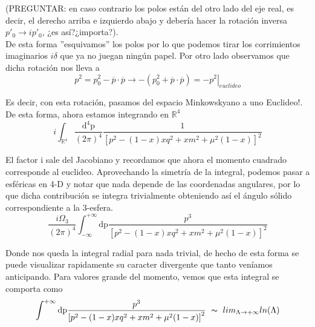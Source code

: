 \documentclass{article}
\numberwithin{equation}{section}
\begin{document}
(PREGUNTAR: en caso contrario los polos están del
otro lado del eje real, es decir, el derecho arriba e izquierdo abajo
y debería hacer la rotación inversa $p'_{0}\rightarrow ip'_{0}$,
¿es así?¿importa?).\\

De esta forma ''esquivamos'' los polos por lo que podemos tirar los corrimientos
imaginarios $i\delta$ que ya no juegan ningún papel. Por otro lado
observamos que dicha rotación nos lleva a 
\begin{equation}
p^{2}=p_{0}^{2}-\overline{p}\cdot\overline{p}\rightarrow-\left(p_{0}^{2}+\overline{p}\cdot\overline{p}\right)=\left. -p^{2}\right|_{euclideo}
\end{equation}

Es decir, con esta rotación, pasamos del espacio Minkowskyano a uno
Euclideo!. De esta forma, ahora estamos integrando en $\mathbb{R}^{4}$
\begin{equation}\label{parteeuclidea}
i\int_{\mathbb{R}^{4}}\frac{\mathrm{d^{4}p}}{(2\pi)^{4}}\frac{1}{\left[p^{2}-(1-x)xq^{2} + x m^{2} + \mu^{2}(1-x)\right]^{2}}
\end{equation}

El factor i sale del Jacobiano y recordamos que ahora el momento cuadrado corresponde al
euclideo. Aprovechando la simetría de la integral, podemos pasar a esféricas
en 4-D y notar que nada depende de las coordenadas angulares, por lo que dicha contribución se integra trivialmente obteniendo así el ángulo sólido correspondiente a la 3-esfera. 
\begin{equation}
\frac{i\Omega_{3}}{(2\pi)^{4}}\int_{-\infty}^{+\infty}\mathrm{dp}\frac{p^{3}}{\left[p^{2}-(1-x)xq^{2} + x m^{2} + \mu^{2}(1-x)\right]^{2}}
\end{equation}

Donde nos queda la integral radial para nada trivial, de hecho de esta forma se puede visualizar rapidamente su caracter divergente que tanto veníamos anticipando. Para valores grande del momento, vemos que esta integral se comporta como
\begin{equation}
\int^{+\infty}\mathrm{dp}\frac{p^{3}}{\left[p^{2}-(1-x)xq^{2} + x m^{2} + \mu^{2}(1-x)\right]^{2}}\ \thicksim\ lim_{\Lambda\rightarrow+\infty}ln(\Lambda)
\end{equation}
\end{document}
